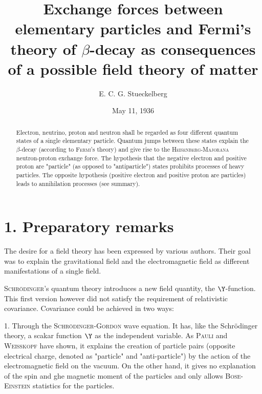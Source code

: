\documentclass{article}
\title{Exchange forces between elementary particles and Fermi's theory of $\beta$-decay as consequences of a possible field theory of matter}
\date{May 11, 1936}
\author{E. C. G. Stueckelberg}
\begin{document}
\maketitle

\begin{abstract}
Electron, neutrino, proton and neutron shall be regarded as four different quantum states of a single elementary particle. Quantum jumps between these states explain the $\beta$-decay (according to \textsc{Fermi}'s theory) and give rise to the \textsc{Heisenberg-Majorana} neutron-proton exchange force. The hypothesis that the negative electron and positive proton are "particle" (as opposed to "antiparticle") states prohibits  processes of heavy particles. The opposite hypothesis (positive electron and positive proton are particles) leads to annihilation processes (see summary).
\end{abstract}

\section*{1. Preparatory remarks}

The desire for a  field theory has been expressed by various authors\cite{1}. Their goal was to explain the gravitational field and the electromagnetic field as different manifestations of a single field.

\textsc{Schr\"odinger}'s quantum theory introduces a new field quantity, the $\Y$-function. This first version however did not satisfy the requirement of relativistic covariance. Covariance could be achieved in two ways:

1. Through the \textsc{Schr\"odinger-Gordon} wave equation. It has, like the Schr\"odinger theory, a scakar function $\Y$ as the independent variable. As \textsc{Pauli} and \textsc{Weisskopf}\cite{2} have shown, it explains the creation of particle pairs (opposite electrical charge, denoted as "particle" and "anti-particle") by the action of the electromagnetic field on the vacuum. On the other hand, it gives no explanation of the spin and ghe magnetic moment of the particles and only allows \textsc{Bose-Einstein} statistics for the particles.
\end{document}
